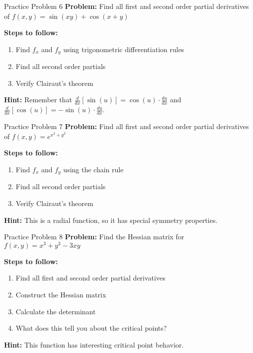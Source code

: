 \documentclass[aspectratio=169]{beamer}
\begin{document}
\begin{frame}{Practice Problem 6}
\textbf{Problem:} Find all first and second order partial derivatives of $f(x,y) = \sin(xy) + \cos(x + y)$

\textbf{Steps to follow:}
\begin{enumerate}
    \item Find $f_x$ and $f_y$ using trigonometric differentiation rules
    \item Find all second order partials
    \item Verify Clairaut's theorem
\end{enumerate}

\textbf{Hint:} Remember that $\frac{d}{dx}[\sin(u)] = \cos(u) \cdot \frac{du}{dx}$ and $\frac{d}{dx}[\cos(u)] = -\sin(u) \cdot \frac{du}{dx}$.
\end{frame}

\begin{frame}{Practice Problem 7}
\textbf{Problem:} Find all first and second order partial derivatives of $f(x,y) = e^{x^2 + y^2}$

\textbf{Steps to follow:}
\begin{enumerate}
    \item Find $f_x$ and $f_y$ using the chain rule
    \item Find all second order partials
    \item Verify Clairaut's theorem
\end{enumerate}

\textbf{Hint:} This is a radial function, so it has special symmetry properties.
\end{frame}

\begin{frame}{Practice Problem 8}
\textbf{Problem:} Find the Hessian matrix for $f(x,y) = x^3 + y^3 - 3xy$

\textbf{Steps to follow:}
\begin{enumerate}
    \item Find all first and second order partial derivatives
    \item Construct the Hessian matrix
    \item Calculate the determinant
    \item What does this tell you about the critical points?
\end{enumerate}

\textbf{Hint:} This function has interesting critical point behavior.
\end{frame}
\end{document}
